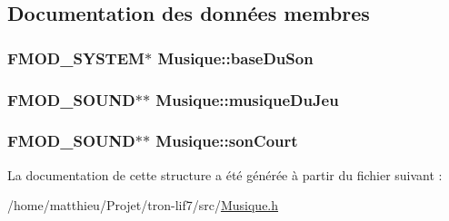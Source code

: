 \subsection{Documentation des données membres}
\hypertarget{structMusique_a5ac7591cc431a2ef548d48e9cf858d94}{
\subsubsection[{base\-Du\-Son}]{\setlength{\rightskip}{0pt plus 5cm}F\-M\-O\-D\-\_\-\-S\-Y\-S\-T\-E\-M$\ast$ Musique\-::base\-Du\-Son}}\label{structMusique_a5ac7591cc431a2ef548d48e9cf858d94}
\hypertarget{structMusique_a442e0e2e689699e3bb72eb8c8e4e14c2}{
\subsubsection[{musique\-Du\-Jeu}]{\setlength{\rightskip}{0pt plus 5cm}F\-M\-O\-D\-\_\-\-S\-O\-U\-N\-D$\ast$$\ast$ Musique\-::musique\-Du\-Jeu}}\label{structMusique_a442e0e2e689699e3bb72eb8c8e4e14c2}
\hypertarget{structMusique_ae957f32de4befa0f625f4b7229e3d660}{
\subsubsection[{son\-Court}]{\setlength{\rightskip}{0pt plus 5cm}F\-M\-O\-D\-\_\-\-S\-O\-U\-N\-D$\ast$$\ast$ Musique\-::son\-Court}}\label{structMusique_ae957f32de4befa0f625f4b7229e3d660}


La documentation de cette structure a été générée à partir du fichier suivant \-:\begin{DoxyCompactItemize}
\item 
/home/matthieu/\-Projet/tron-\/lif7/src/\hyperlink{Musique_8h}{Musique.\-h}\end{DoxyCompactItemize}
